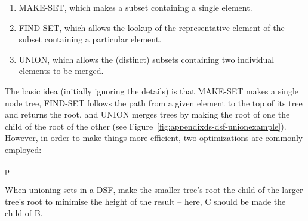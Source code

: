 \begin{enumerate}

\item MAKE-SET, which makes a subset containing a single element.
\item FIND-SET, which allows the lookup of the representative element of the subset containing a particular element.
\item UNION, which allows the (distinct) subsets containing two individual elements to be merged.

\end{enumerate}
%
The basic idea (initially ignoring the details) is that MAKE-SET makes a single node tree, FIND-SET follows the path from a given element to the top of its tree and returns the root, and UNION merges trees by making the root of one the child of the root of the other (see Figure~\ref{fig:appendixds-dsf-unionexample}). However, in order to make things more efficient, two optimizations are commonly employed:

\begin{stusubfig}{p}
	\hspace{4mm}%
	\hspace{4mm}%
\caption{When unioning sets in a DSF, make the smaller tree's root the child of the larger tree's root to minimise the height of the result -- here, C should be made the child of B.}
\label{fig:appendixds-dsf-unionexample}
\end{stusubfig}

